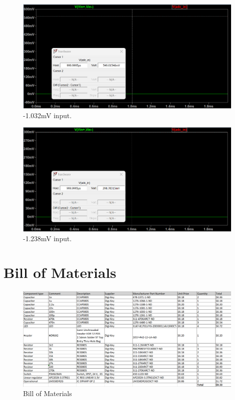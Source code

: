 \begin{figure}[h]
\centering
\includegraphics[width=\textwidth]{proposal/parts/-1.032mV.png}
\caption{-1.032mV input.}
\end{figure}

\begin{figure}[h]
\centering
\includegraphics[width=\textwidth]{proposal/parts/-1.238mV.png}
\caption{-1.238mV input.}
\end{figure}

\chapter{Bill of Materials}

\begin{figure}[h]
\centering
\includegraphics[width=\textwidth]{proposal/parts/BOM.png}
\caption{Bill of Materials}
\end{figure}